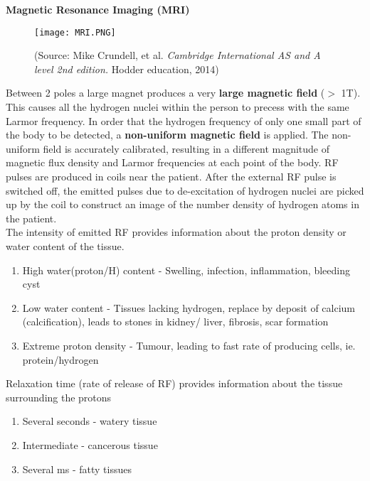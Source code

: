 \documentclass{article}
\begin{document}
\begin{flushleft}
 \textbf{Magnetic Resonance Imaging (MRI)}
\end{flushleft}

\begin{figure}[H]
    \centering
    \texttt{[image: MRI.PNG]}
    \caption*{(Source: Mike Crundell, et al. \textit{Cambridge International AS and A level 2nd edition.} Hodder education, 2014)}
\end{figure}

Between 2 poles a large magnet produces a very \textbf{large magnetic field} ($>$ 1T). This causes all the hydrogen nuclei within the person to precess with the same Larmor frequency.
In order that the hydrogen frequency of only one small part of the body to be detected, a \textbf{non-uniform magnetic field} is applied. The non-uniform field is accurately calibrated, resulting in a different magnitude of magnetic flux density and Larmor frequencies at each point of the body. RF pulses are produced in coils near the patient. After the external RF pulse is switched off, the emitted pulses due to de-excitation of hydrogen nuclei are picked up by the coil to construct an image of the number density of hydrogen atoms in the patient. 
\\The intensity of emitted RF provides information about the proton density or water content of the tissue. 
\begin{enumerate}
    \item High water(proton/H) content - Swelling, infection, inflammation, bleeding cyst
    \item Low water content - Tissues lacking hydrogen, replace by deposit of calcium (calcification), leads to stones in kidney/ liver, fibrosis, scar formation
    \item Extreme proton density - Tumour, leading to fast rate of producing cells, ie. protein/hydrogen
\end{enumerate}
Relaxation time (rate of release of RF) provides information about the tissue surrounding the protons
\begin{enumerate}
    \item Several seconds - watery tissue
    \item Intermediate - cancerous tissue
    \item Several ms - fatty tissues
\end{enumerate}
\end{document}
